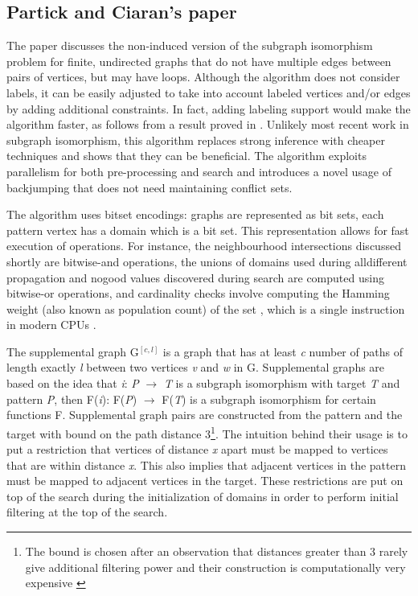 \documentclass{l4proj}
\begin{document}
\subsection{Partick and Ciaran's paper}
\label{sec:sippatrick}
The paper discusses the non-induced version of the subgraph isomorphism problem for finite, undirected graphs that do not have multiple edges between pairs of vertices, but may have loops. Although the algorithm does not consider labels, it can be easily adjusted to take into account labeled vertices and/or edges by adding additional constraints. In fact, adding labeling support would make the algorithm faster, as follows from a result proved in \cite{Ciaran:2016}. Unlikely most recent work in subgraph isomorphism\cite{Solnon:2010a,SND}, this algorithm replaces strong inference with cheaper techniques and shows that they can be beneficial. The algorithm exploits parallelism for both pre-processing and search and introduces a novel usage of backjumping that does not need maintaining conflict sets. 

The algorithm uses bitset encodings: graphs are represented as bit sets, each pattern vertex has a domain which is a bit set. This representation allows for fast execution of operations. For instance, the neighbourhood intersections discussed shortly are bitwise-and operations, the unions of domains used during alldifferent propagation and nogood values discovered during search are computed using bitwise-or operations, and cardinality checks involve computing the Hamming weight (also known as population count) of the set \cite{Reed:1954}, which is a single instruction in modern CPUs \cite{CP2015}.  

The supplemental graph G$^{[c,l]}$ is a graph that has at least \emph{c}
number of paths of length exactly \emph{l} between two vertices \emph{v} and \emph{w} in G\cite{CP2015}. Supplemental graphs are based on the idea that \emph{i}: \emph{P} $\rightarrow$ \emph{T} is a subgraph isomorphism with target \emph{T} and pattern \emph{P}, then F(\emph{i}): F(\emph{P}) $\rightarrow$ F(\emph{T}) is a subgraph isomorphism for certain functions F. Supplemental graph pairs are constructed from the pattern and the target with bound on the path distance 3\footnote{The bound is chosen after an observation that distances greater than 3 rarely give additional filtering power and their construction is computationally very expensive \cite{CP2015}}. The intuition behind their usage is to put a restriction that vertices of distance \emph{x} apart must be mapped to vertices that are within distance \emph{x}. This also implies that adjacent vertices in the pattern must be mapped to adjacent vertices in the target. These restrictions are put on top of the search during the initialization of domains in order to perform initial filtering at the top of the search.
\end{document}
